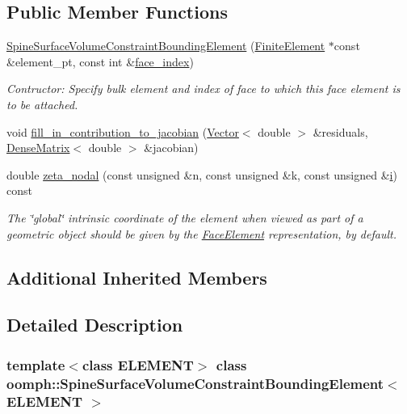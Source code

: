 \subsection*{Public Member Functions}
\begin{DoxyCompactItemize}
\item 
\hyperlink{classoomph_1_1SpineSurfaceVolumeConstraintBoundingElement_a1426f4750d43008e7c33526cf01f23f3}{Spine\+Surface\+Volume\+Constraint\+Bounding\+Element} (\hyperlink{classoomph_1_1FiniteElement}{Finite\+Element} $\ast$const \&element\+\_\+pt, const int \&\hyperlink{classoomph_1_1FaceElement_a478d577ac6db67ecc80f1f02ae3ab170}{face\+\_\+index})
\begin{DoxyCompactList}\small\item\em Contructor\+: Specify bulk element and index of face to which this face element is to be attached. \end{DoxyCompactList}\item 
void \hyperlink{classoomph_1_1SpineSurfaceVolumeConstraintBoundingElement_a5eec2e025f24120c6f2a959da70bb5b1}{fill\+\_\+in\+\_\+contribution\+\_\+to\+\_\+jacobian} (\hyperlink{classoomph_1_1Vector}{Vector}$<$ double $>$ \&residuals, \hyperlink{classoomph_1_1DenseMatrix}{Dense\+Matrix}$<$ double $>$ \&jacobian)
\item 
double \hyperlink{classoomph_1_1SpineSurfaceVolumeConstraintBoundingElement_aa252629ad8c455a83b5f2e9643a36e94}{zeta\+\_\+nodal} (const unsigned \&n, const unsigned \&k, const unsigned \&\hyperlink{cfortran_8h_adb50e893b86b3e55e751a42eab3cba82}{i}) const
\begin{DoxyCompactList}\small\item\em The \char`\"{}global\char`\"{} intrinsic coordinate of the element when viewed as part of a geometric object should be given by the \hyperlink{classoomph_1_1FaceElement}{Face\+Element} representation, by default. \end{DoxyCompactList}\end{DoxyCompactItemize}
\subsection*{Additional Inherited Members}


\subsection{Detailed Description}
\subsubsection*{template$<$class E\+L\+E\+M\+E\+NT$>$\newline
class oomph\+::\+Spine\+Surface\+Volume\+Constraint\+Bounding\+Element$<$ E\+L\+E\+M\+E\+N\+T $>$}

